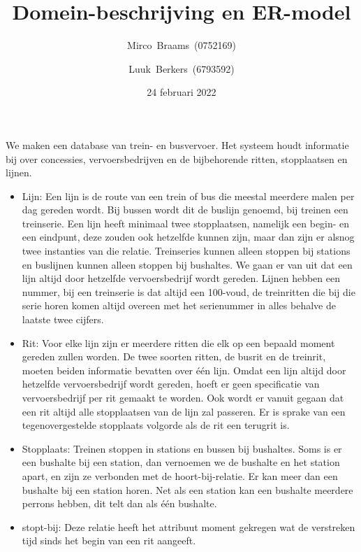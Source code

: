 \documentclass[a4paper]{scrartcl}
\title{Domein-beschrijving en ER-model}
\author{Mirco~Braams~(0752169) \and Luuk~Berkers~(6793592)}
\date{24 februari 2022}
\begin{document}
    \maketitle

    We maken een database van trein- en busvervoer.
    Het systeem houdt informatie bij over concessies, vervoersbedrijven en de bijbehorende ritten, stopplaatsen en lijnen.

    \begin{itemize}
        \item Lijn: Een lijn is de route van een trein of bus die meestal meerdere malen per dag gereden wordt.
        Bij bussen wordt dit de buslijn genoemd, bij treinen een treinserie.
        Een lijn heeft minimaal twee stopplaatsen, namelijk een begin- en een eindpunt, deze zouden ook hetzelfde kunnen zijn, maar dan zijn er alsnog twee instanties van die relatie.
        Treinseries kunnen alleen stoppen bij stations en buslijnen kunnen alleen stoppen bij bushaltes.
        We gaan er van uit dat een lijn altijd door hetzelfde vervoersbedrijf wordt gereden.
        Lijnen hebben een nummer, bij een treinserie is dat altijd een 100-voud, de treinritten die bij die serie horen komen altijd overeen met het serienummer in alles behalve de laatste twee cijfers.

        \item Rit: Voor elke lijn zijn er meerdere ritten die elk op een bepaald moment gereden zullen worden. De twee soorten ritten, de busrit en de treinrit, moeten beiden informatie bevatten over één lijn. Omdat een lijn altijd door hetzelfde vervoersbedrijf wordt gereden, hoeft er geen specificatie van vervoersbedrijf per rit gemaakt te worden. Ook wordt er vanuit gegaan dat een rit altijd alle stopplaatsen van de lijn zal passeren. Er is sprake van een tegenovergestelde stopplaats volgorde als de rit een terugrit is.

        \item Stopplaats: Treinen stoppen in stations en bussen bij bushaltes.
        Soms is er een bushalte bij een station, dan vernoemen we de bushalte en het station apart, en zijn ze verbonden met de hoort-bij-relatie. Er kan meer dan een bushalte bij een station horen.
        Net als een station kan een bushalte meerdere perrons hebben, dit telt dan als één bushalte.

        \item stopt-bij: Deze relatie heeft het attribuut moment gekregen wat de verstreken tijd sinds het begin van een rit aangeeft.


\end{itemize}
\end{document}
